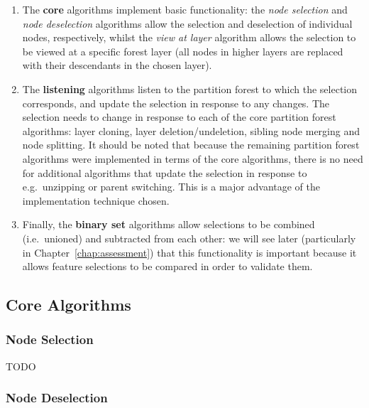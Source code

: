 \begin{enumerate}

\item The \textbf{core} algorithms implement basic functionality: the \emph{node selection} and \emph{node deselection} algorithms allow the selection and deselection of individual nodes, respectively, whilst the \emph{view at layer} algorithm allows the selection to be viewed at a specific forest layer (all nodes in higher layers are replaced with their descendants in the chosen layer).

\item The \textbf{listening} algorithms listen to the partition forest to which the selection corresponds, and update the selection in response to any changes. The selection needs to change in response to each of the core partition forest algorithms: layer cloning, layer deletion/undeletion, sibling node merging and node splitting. It should be noted that because the remaining partition forest algorithms were implemented in terms of the core algorithms, there is no need for additional algorithms that update the selection in response to e.g.~unzipping or parent switching. This is a major advantage of the implementation technique chosen.

\item Finally, the \textbf{binary set} algorithms allow selections to be combined (i.e.~unioned) and subtracted from each other: we will see later (particularly in Chapter~\ref{chap:assessment}) that this functionality is important because it allows feature selections to be compared in order to validate them.

\end{enumerate}

\subsection{Core Algorithms}

\subsubsection{Node Selection}

TODO

\subsubsection{Node Deselection}

